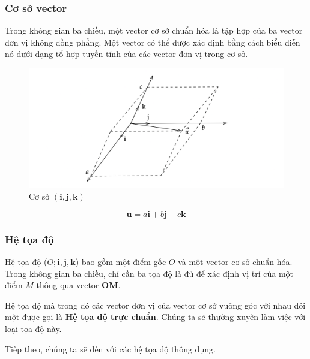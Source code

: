 \subsubsection{Cơ sở vector}
Trong không gian ba chiều, một vector cơ sở chuẩn hóa là tập hợp của ba vector đơn vị không đồng phẳng. Một vector có thể được xác định bằng cách biểu diễn nó dưới dạng tổ hợp tuyến tính của các vector đơn vị trong cơ sở.
\begin{figure}[H]
    \centering
    \includegraphics[width=1\textwidth]{Tuan2/Figures/cosovector.png}
    \caption{Cơ sở \((\mathbf{i}, \mathbf{j}, \mathbf{k})\)}
\end{figure}
\begin{equation}
    \mathbf{u}=a\mathbf{i}+b\mathbf{j}+c\mathbf{k}
\end{equation}
\subsubsection{Hệ tọa độ}
Hệ tọa độ (\(O; \mathbf{i}, \mathbf{j}, \mathbf{k}\)) bao gồm một điểm gốc \(O\) và một vector cơ sở chuẩn hóa. Trong không gian ba chiều, chỉ cần ba tọa độ là đủ để xác định vị trí của một điểm \(M\) thông qua vector \(\mathbf{OM}\).

Hệ tọa độ mà trong đó các vector đơn vị của vector cơ sở vuông góc với nhau đôi một được gọi là \textbf{Hệ tọa độ trực chuẩn}. Chúng ta sẽ thường xuyên làm việc với loại tọa độ này.

Tiếp theo, chúng ta sẽ đến với các hệ tọa độ thông dụng.

